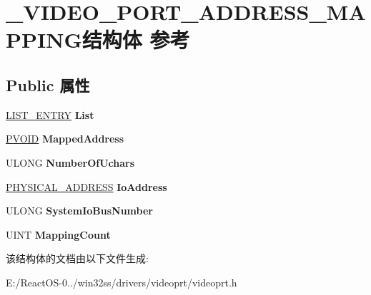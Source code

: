 \hypertarget{struct___v_i_d_e_o___p_o_r_t___a_d_d_r_e_s_s___m_a_p_p_i_n_g}{}\section{\+\_\+\+V\+I\+D\+E\+O\+\_\+\+P\+O\+R\+T\+\_\+\+A\+D\+D\+R\+E\+S\+S\+\_\+\+M\+A\+P\+P\+I\+N\+G结构体 参考}
\label{struct___v_i_d_e_o___p_o_r_t___a_d_d_r_e_s_s___m_a_p_p_i_n_g}
\subsection*{Public 属性}
\begin{DoxyCompactItemize}
\item 
\mbox{\label{struct___v_i_d_e_o___p_o_r_t___a_d_d_r_e_s_s___m_a_p_p_i_n_g_a7100912ac7886a2c99ff29c92600ce05}} 
\hyperlink{struct___l_i_s_t___e_n_t_r_y}{L\+I\+S\+T\+\_\+\+E\+N\+T\+RY} {\bfseries List}
\item 
\mbox{\label{struct___v_i_d_e_o___p_o_r_t___a_d_d_r_e_s_s___m_a_p_p_i_n_g_a70fd0eefb98839d0ba2d94bf4c8f8d7c}} 
\hyperlink{interfacevoid}{P\+V\+O\+ID} {\bfseries Mapped\+Address}
\item 
\mbox{\label{struct___v_i_d_e_o___p_o_r_t___a_d_d_r_e_s_s___m_a_p_p_i_n_g_ad5489966a5db85dd3db1817f730ba699}} 
U\+L\+O\+NG {\bfseries Number\+Of\+Uchars}
\item 
\mbox{\label{struct___v_i_d_e_o___p_o_r_t___a_d_d_r_e_s_s___m_a_p_p_i_n_g_aeb6cb7c1ba3be6124317b190faabd7dc}} 
\hyperlink{union___l_a_r_g_e___i_n_t_e_g_e_r}{P\+H\+Y\+S\+I\+C\+A\+L\+\_\+\+A\+D\+D\+R\+E\+SS} {\bfseries Io\+Address}
\item 
\mbox{\label{struct___v_i_d_e_o___p_o_r_t___a_d_d_r_e_s_s___m_a_p_p_i_n_g_ab208c56901cfaf7a65dd7e1adadb0244}} 
U\+L\+O\+NG {\bfseries System\+Io\+Bus\+Number}
\item 
\mbox{\label{struct___v_i_d_e_o___p_o_r_t___a_d_d_r_e_s_s___m_a_p_p_i_n_g_a0eee12c376304e3a31e9b4af61d10726}} 
U\+I\+NT {\bfseries Mapping\+Count}
\end{DoxyCompactItemize}


该结构体的文档由以下文件生成\+:\begin{DoxyCompactItemize}
\item 
E\+:/\+React\+O\+S-\/0../win32ss/drivers/videoprt/videoprt.\+h\end{DoxyCompactItemize}
